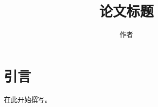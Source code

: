 \documentclass[10pt]{article}
\title{论文标题}
\author{作者}
\date{}
\begin{document}
\maketitle

\section{引言}
在此开始撰写。
\end{document}
